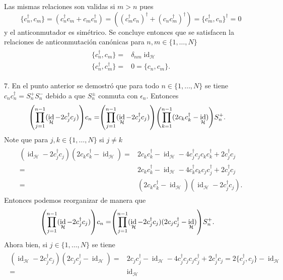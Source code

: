 \documentclass{article}
\DeclareMathOperator{\id}{id}
\begin{document}
Las mismas relaciones son validas si $m>n$ pues
\begin{equation}
\{c_n^\dagger,c_m\}=(c_n^\dagger c_m+c_mc_n^\dagger)=((c_m^\dagger c_n)^\dagger+(c_nc_m^\dagger)^\dagger)=\{c_m^\dagger,c_n\}^\dagger=0
\end{equation}
y el anticonmutador es simétrico. Se concluye entonces que se satisfacen la relaciones de anticonmutación canónicas para $n,m\in\{1,\dots,N\}$
\begin{align}
\begin{split}
\{c_n^\dagger,c_m\}=&\delta_{nm}\id_\mathcal{H}\\
\{c_n^\dagger,c_m^\dagger\}=&0=\{c_n,c_m\}.
\end{split}
\end{align}

7. En el punto anterior se demostró que para todo $n\in\{1,\dots,N\}$ se tiene $c_nc_n^\dagger=S_n^+S_n^-$ debido a que $S_n^\pm$ conmuta con $\epsilon_n$. Entonces
\begin{align}
\begin{split}
\qty(\prod_{j=1}^{n-1}(\id_\mathcal{H}-2c_j^\dagger c_j))c_n=&\qty(\prod_{j=1}^{n-1}(\id_\mathcal{H}-2c_j^\dagger c_j))\qty(\prod_{k=1}^{n-1}(2c_k c_k^\dagger-\id_\mathcal{H}))S_n^+.
\end{split}
\end{align}
Note que para $j,k\in\{1,\dots,N\}$ si $j\neq k$
\begin{align}
\begin{split}
(\id_\mathcal{H}-2c_j^\dagger c_j)(2c_kc_k^\dagger-\id_\mathcal{H})=&2c_kc_k^\dagger-\id_\mathcal{H}-4c_j^\dagger c_jc_kc_k^\dagger + 2c_j^\dagger c_j\\
=&2c_kc_k^\dagger-\id_\mathcal{H}-4c_k^\dagger c_kc_jc_j^\dagger + 2c_j^\dagger c_j\\
=&(2c_kc_k^\dagger-\id_\mathcal{H})(\id_\mathcal{H}-2c_j^\dagger c_j).
\end{split}
\end{align}
Entonces podemos reorganizar de manera que 
\begin{align}
\begin{split}
\qty(\prod_{j=1}^{n-1}(\id_\mathcal{H}-2c_j^\dagger c_j))c_n=&\qty(\prod_{j=1}^{n-1}(\id_\mathcal{H}-2c_j^\dagger c_j)(2c_j c_j^\dagger-\id_\mathcal{H}))S_n^+.
\end{split}
\end{align}
Ahora bien, si $j\in\{1,\dots,N\}$ se tiene
\begin{align}
\begin{split}
(\id_\mathcal{H}-2c_j^\dagger c_j)(2c_j c_j^\dagger-\id_\mathcal{H})=&2c_jc_j^\dagger-\id_\mathcal{H}-4c_j^\dagger c_jc_jc_j^\dagger + 2c_j^\dagger c_j=2\{c_j^\dagger,c_j\}-\id_\mathcal{H}\\
=&\id_\mathcal{H}\\
\end{split}
\end{align}
\end{document}
